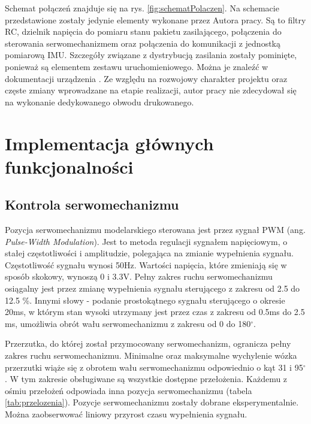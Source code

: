 Schemat połączeń znajduje się na rys. \ref{fig:schematPolaczen}. Na schemacie przedstawione zostały jedynie elementy wykonane przez Autora pracy. Są to filtry RC, dzielnik napięcia do pomiaru stanu pakietu zasilającego, połączenia do sterowania serwomechanizmem oraz połączenia do komunikacji z jednostką pomiarową IMU. Szczegóły związane z dystrybucją zasilania zostały pominięte, ponieważ są elementem zestawu uruchomieniowego. Można je znaleźć w dokumentacji urządzenia \cite{tivaWork}. Ze względu na rozwojowy charakter projektu oraz częste zmiany wprowadzane na etapie realizacji, autor pracy nie zdecydował się na wykonanie dedykowanego obwodu drukowanego.

\section{Implementacja głównych funkcjonalności}
\subsection{Kontrola serwomechanizmu}
Pozycja serwomechanizmu modelarskiego sterowana jest przez sygnał PWM (ang. {\em Pulse-Width Modulation}). Jest to metoda regulacji sygnałem napięciowym, o stałej częstotliwości i amplitudzie, polegająca na zmianie wypełnienia sygnału. Częstotliwość sygnału wynosi 50Hz. Wartości napięcia, które zmieniają się w sposób skokowy, wynoszą 0 i 3.3V. Pełny zakres ruchu serwomechanizmu osiągalny jest przez zmianę wypełnienia sygnału sterującego z zakresu od 2.5 do 12.5 \%. Innymi słowy - podanie prostokątnego sygnału sterującego o okresie 20ms, w którym stan wysoki utrzymany jest przez czas z zakresu od 0.5ms do 2.5 ms, umożliwia obrót wału serwomechanizmu z zakresu od 0 do 180$^{\circ}$.

Przerzutka, do której został przymocowany serwomechanizm, ogranicza pełny zakres ruchu serwomechanizmu. Minimalne oraz maksymalne wychylenie wózka przerzutki wiąże się z obrotem wału serwomechanizmu odpowiednio o kąt 31 i 95$^{\circ}$. W tym zakresie obsługiwane są wszystkie dostępne przełożenia. Każdemu z ośmiu przełożeń odpowiada inna pozycja serwomechanizmu (tabela \ref{tab:przelozenia}). Pozycje serwomechanizmu zostały dobrane eksperymentalnie. Można zaobserwować liniowy przyrost czasu wypełnienia sygnału. 

